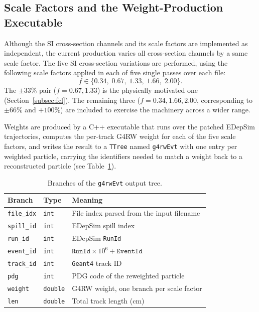 \documentclass[%
article,
nofootinbib
]{revtex4-2}
\DeclareRobustCommand{\gfour}{\texttt{Geant4}}
\begin{document}
\subsection{\label{subsec:executable}Scale Factors and the Weight-Production Executable}

Although the SI cross-section channels and its scale factors are implemented as independent, the current production varies all cross-section channels by a same scale factor. The five SI cross-section variations are performed, using the following scale factors applied in each of five single passes over each file:
\begin{equation}
\label{eq:scale_factors}
f \in \{0.34,\; 0.67,\; 1.33,\; 1.66,\; 2.00\}.
\end{equation}
The $\pm33\%$ pair ($f = 0.67, 1.33$) is the physically motivated one
(Section~\ref{subsec:fcl}). The remaining three ($f = 0.34, 1.66, 2.00$,
corresponding to $\pm66\%$ and $+100\%$) are included to exercise the
machinery across a wider range.

Weights are produced by a C++ executable that
runs over the patched EDepSim trajectories, computes the per-track G4RW
weight for each of the five scale factors, and writes the result to a
\texttt{TTree} named \texttt{g4rwEvt} with one entry per weighted particle,
carrying the identifiers needed to match a weight back to a reconstructed
particle (see Table~\ref{tab:weight_tree}).

\begin{table}[H]
\centering
\caption{Branches of the \texttt{g4rwEvt} output tree.}
\label{tab:weight_tree}
\setlength{\tabcolsep}{14pt}
\begin{tabular}{lll}
\hline\hline
Branch & Type & Meaning \\
\hline
\texttt{file\_idx} & \texttt{int}    & File index parsed from the input filename \\
\texttt{spill\_id} & \texttt{int}    & EDepSim spill index \\
\texttt{run\_id}   & \texttt{int}    & EDepSim \texttt{RunId} \\
\texttt{event\_id} & \texttt{int}    & $\texttt{RunId}\times10^{6} + \texttt{EventId}$ \\
\texttt{track\_id} & \texttt{int}    & \gfour{} track ID \\
\texttt{pdg}       & \texttt{int}    & PDG code of the reweighted particle \\
\texttt{weight}    & \texttt{double} & G4RW weight, one branch per scale factor \\
\texttt{len}       & \texttt{double} & Total track length (cm) \\
\hline\hline
\end{tabular}
\end{table}
\end{document}
